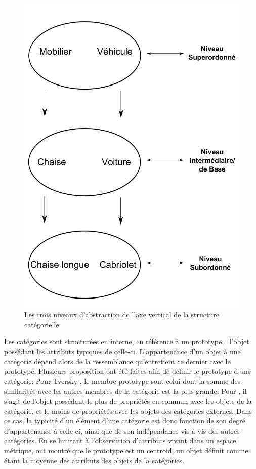 \begin{itemize}
\end{itemize}

\begin{figure}[bth]
        \myfloatalign
        \includegraphics[width=.6\linewidth]{gfx/categorieLVL}
        \caption{Les trois niveaux d'abstraction de l'axe vertical de la structure catégorielle.}\label{fig:categorieLVL}
\end{figure}

Les catégories sont structurées en interne, en référence à un prototype, \ie~l'objet possédant les attributs typiques de celle-ci. L'appartenance d'un objet à une catégorie dépend alors de la ressemblance qu'entretient ce dernier avec le prototype.  Plusieurs proposition ont été faites afin de définir le prototype d'une catégorie: Pour Tversky \citep{tversky1977features}, le membre prototype sont celui dont la somme des similarités avec les autres membres de la catégorie est la plus grande. Pour \citep{rosch1975family}, il s'agit de l'objet possédant le plus de propriétés en commun avec les objets de la catégorie, et le moins de propriétés avec les objets des catégories externes. Dans ce cas, la typicité d'un élément d'une catégorie est donc fonction de son degré d'appartenance à celle-ci, ainsi que de son indépendance vis à vis des autres catégories. En se limitant à l'observation d'attributs vivant dans un espace métrique, \citep{reed1972pattern, rosch1976structural} ont montré que le prototype est un centroid, un objet définit comme étant la moyenne des attributs des objets de la catégories.


